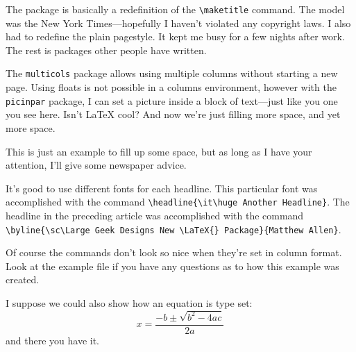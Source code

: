 \documentclass{article}
\date{\today}
\begin{document}
\maketitle

\begin{multicols}{3}{


The package is basically a redefinition of the \verb+\maketitle+ command.  The model was the New York Times---hopefully I haven't violated any copyright laws.  I also had to redefine the plain pagestyle.  It kept me busy for a few nights after work.  The rest is packages other people have written.      

\begin{window} The \verb+multicols+ package allows using multiple columns without starting a new page.  Using floats is not possible in a columns environment, however with the \verb+picinpar+ package, I can set a picture inside a block of text---just like you one you see here.  Isn't \LaTeX{} cool?
And now we're just filling more space, and yet more space.  
\end{window}
\closearticle


This is just an example to fill up some space, but as long as I have your attention, I'll give some newspaper advice.

It's good to use different fonts for each headline.  This particular font was accomplished with the command \verb+\headline{\it\huge Another Headline}+.  The headline in the preceding article was accomplished with the command \verb+\byline{\sc\Large Geek Designs New \LaTeX{} Package}{Matthew Allen}+.

Of course the commands don't look so nice when they're set in column format.  Look at the example file if you have any questions as to how this example was created.

I suppose we could also show how an equation is type set:
\begin{displaymath}
x=\frac{-b\pm\sqrt{b^2-4ac}}{2a}
\end{displaymath}
and there you have it.  \closearticle
}
\end{multicols}
\end{document}
